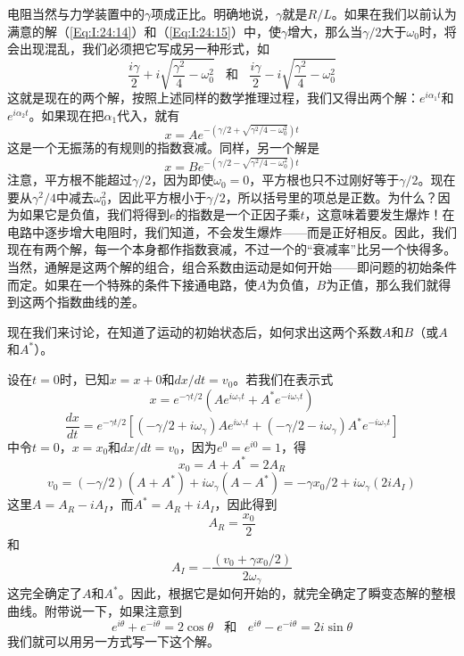 电阻当然与力学装置中的$\gamma$项成正比。明确地说，$\gamma$就是$R/L$。如果在我们以前认为满意的解（\ref{Eq:I:24:14}）和（\ref{Eq:I:24:15}）中，使$\gamma$增大，那么当$\gamma/2$大于$\omega_0$时，将会出现混乱，我们必须把它写成另一种形式，如
\begin{equation*}
    \frac{i\gamma}{2} + i\sqrt{\frac{\gamma^2}{4} - \omega_0^2} ~~~~\text{和}~~~~
    \frac{i\gamma}{2} - i\sqrt{\frac{\gamma^2}{4} - \omega_0^2}
\end{equation*}
这就是现在的两个解，按照上述同样的数学推理过程，我们又得出两个解：$e^{i\alpha_1t}$和$e^{i\alpha_2t}$。如果现在把$\alpha_1$代入，就有
\begin{equation*}
    x=Ae^{-(\gamma/2+\sqrt{\gamma^2/4-\omega_0^2})t}
\end{equation*}
这是一个无振荡的有规则的指数衰减。同样，另一个解是
\begin{equation*}
    x=Be^{-(\gamma/2-\sqrt{\gamma^2/4-\omega_0^2})t}
\end{equation*}
注意，平方根不能超过$\gamma/2$，因为即使$\omega_0=0$，平方根也只不过刚好等于$\gamma/2$。现在要从$\gamma^2/4$中减去$\omega_0^2$，因此平方根小于$\gamma/2$，所以括号里的项总是正数。为什么？因为如果它是负值，我们将得到$e$的指数是一个正因子乘$t$，这意味着要发生爆炸！在电路中逐步增大电阻时，我们知道，不会发生爆炸——而是正好相反。因此，我们现在有两个解，每一个本身都作指数衰减，不过一个的“衰减率”比另一个快得多。当然，通解是这两个解的组合，组合系数由运动是如何开始——即问题的初始条件而定。如果在一个特殊的条件下接通电路，使$A$为负值，$B$为正值，那么我们就得到这两个指数曲线的差。

现在我们来讨论，在知道了运动的初始状态后，如何求出这两个系数$A$和$B$（或$A$和$A^*$）。

设在$t=0$时，已知$x=x+0$和$dx/dt=v_0$。若我们在表示式
\begin{equation*}
    x=e^{-\gamma t/2}(Ae^{i\omega_\gamma t}+A^*e^{-i\omega_\gamma t})
\end{equation*}
\begin{equation*}
    \frac{dx}{dt}=e^{-\gamma t/2}[(-\gamma/2 + i\omega_\gamma)Ae^{i\omega_\gamma t}+(-\gamma/2 - i\omega_\gamma)A^*e^{-i\omega_\gamma t}]
\end{equation*}
中令$t=0$，$x=x_0$和$dx/dt=v_0$，因为$e^0=e^{i0}=1$，得
\begin{equation*}
    x_0=A+A^*=2A_R
\end{equation*}
\begin{equation*}
    v_0=(-\gamma/2)(A+A^*)+i\omega_\gamma(A-A^*) = -\gamma x_0/2+i\omega_\gamma(2iA_I)
\end{equation*}
这里$A=A_R-iA_I$，而$A^*=A_R+iA_I$，因此得到
\begin{equation*}
    A_R=\frac{x_0}{2}
\end{equation*}
和
\begin{equation}
    \label{Eq:I:24:21}
    A_I=-\frac{(v_0+\gamma x_0/2)}{2\omega_\gamma}
\end{equation}
这完全确定了$A$和$A^*$。因此，根据它是如何开始的，就完全确定了瞬变态解的整根曲线。附带说一下，如果注意到
\begin{equation*}
    e^{i\theta}+e^{-i\theta}=2\cos\theta ~~~~\text{和}~~~~  e^{i\theta}-e^{-i\theta}=2i\sin\theta
\end{equation*}
我们就可以用另一方式写一下这个解。

